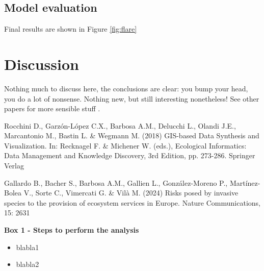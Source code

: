 \documentclass[12pt, a4paper]{article}
\begin{document}
\subsection{Model evaluation}

Final results are shown in Figure \ref{fig:flare}

\section{Discussion}

Nothing much to discuss here, the conclusions are clear: you bump your head, you do a lot of nonsense. Nothing new, but still interesting nonetheless! See other papers for more sensible stuff \cite{Rocchini2018, Gallardo2024}.

\begin{thebibliography}{999}
Rocchini D., Garzón-López C.X., Barbosa A.M., Delucchi L., Olandi J.E., Marcantonio M., Bastin L. \& Wegmann M. (2018) GIS-based Data Synthesis and Visualization. In: Recknagel F. \& Michener W. (eds.), Ecological Informatics: Data Management and Knowledge Discovery, 3rd Edition, pp. 273-286. Springer Verlag

Gallardo B., Bacher S., Barbosa A.M., Gallien L., González-Moreno P., Martínez-Bolea V., Sorte C., Vimercati G. \& Vilà M. (2024) Risks posed by invasive species to the provision of ecosystem services in Europe. Nature Communications, 15: 2631
\end{thebibliography}


\hline


\smallskip

\textbf{Box 1 - Steps to perform the analysis}
\begin{itemize}
\item blabla1
\item blabla2
\end{itemize}
\end{document}
